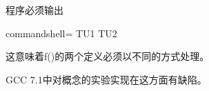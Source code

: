 程序必须输出

\begin{tcblisting}{commandshell={}}
TU1
TU2
\end{tcblisting}

这意味着f()的两个定义必须以不同的方式处理。

\begin{tcolorbox}[colback=webgreen!5!white,colframe=webgreen!75!black]
\hspace*{0.75cm}GCC 7.1中对概念的实验实现在这方面有缺陷。
\end{tcolorbox}























